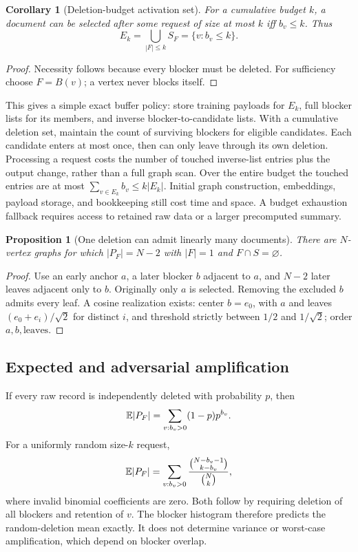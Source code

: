 \documentclass[11pt,a4paper]{article}
\newtheorem{proposition}[theorem]{Proposition}
\newtheorem{corollary}[theorem]{Corollary}
\theoremstyle{definition}\newtheorem{definition}[theorem]{Definition}
\begin{document}
\begin{corollary}[Deletion-budget activation set]\label{cor:eligible}
For a cumulative budget $k$, a document can be selected after some request of size at most $k$ iff $b_v\le k$. Thus
\[
 E_k=\bigcup_{|F|\le k} S_F=\{v:b_v\le k\}.
\]
\end{corollary}
\begin{proof}
Necessity follows because every blocker must be deleted. For sufficiency choose $F=B(v)$; a vertex never blocks itself.
\end{proof}

This gives a simple exact buffer policy: store training payloads for $E_k$, full blocker lists for its members, and inverse blocker-to-candidate lists. With a cumulative deletion set, maintain the count of surviving blockers for eligible candidates. Each candidate enters at most once, then can only leave through its own deletion. Processing a request costs the number of touched inverse-list entries plus the output change, rather than a full graph scan. Over the entire budget the touched entries are at most $\sum_{v\in E_k}b_v\le k|E_k|$. Initial graph construction, embeddings, payload storage, and bookkeeping still cost time and space. A budget exhaustion fallback requires access to retained raw data or a larger precomputed summary.

\begin{proposition}[One deletion can admit linearly many documents]
There are $N$-vertex graphs for which $|P_F|=N-2$ with $|F|=1$ and $F\cap S=\varnothing$.
\end{proposition}
\begin{proof}
Use an early anchor $a$, a later blocker $b$ adjacent to $a$, and $N-2$ later leaves adjacent only to $b$. Originally only $a$ is selected. Removing the excluded $b$ admits every leaf. A cosine realization exists: center $b=e_0$, with $a$ and leaves $(e_0+e_i)/\sqrt2$ for distinct $i$, and threshold strictly between $1/2$ and $1/\sqrt2$; order $a,b,\text{leaves}$.
\end{proof}

\subsection{Expected and adversarial amplification}
If every raw record is independently deleted with probability $p$, then
\begin{equation}
 \mathbb E|P_F|=\sum_{v:b_v>0}(1-p)p^{b_v}.
\end{equation}
For a uniformly random size-$k$ request,
\begin{equation}
 \mathbb E|P_F|=\sum_{v:b_v>0}
 \frac{\binom{N-b_v-1}{k-b_v}}{\binom Nk},
\end{equation}
where invalid binomial coefficients are zero. Both follow by requiring deletion of all blockers and retention of $v$. The blocker histogram therefore predicts the random-deletion mean exactly. It does not determine variance or worst-case amplification, which depend on blocker overlap.
\end{document}
